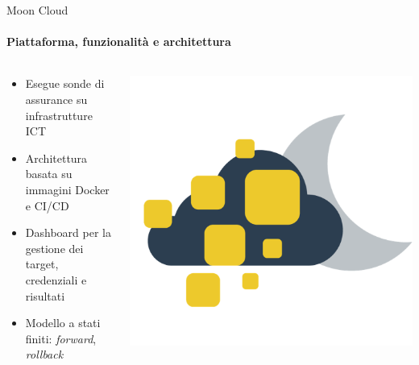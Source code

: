 \documentclass{beamer}
\begin{document}
\begin{frame}{Moon Cloud}
    \framesubtitle{Piattaforma, funzionalità e architettura}
    \begin{columns}
        \begin{column}{0.7\textwidth}
            \begin{itemize}
                \item Esegue sonde di assurance su infrastrutture ICT
                \item Architettura basata su immagini Docker e CI/CD
                \item Dashboard per la gestione dei target, credenziali e risultati
                \item Modello a stati finiti: \textit{forward}, \textit{rollback}
            \end{itemize}
        \end{column}
        \begin{column}{0.3\textwidth}
            \includegraphics[width=\textwidth]{assets/mooncloud.png}
        \end{column}
    \end{columns}
\end{frame}
\end{document}
